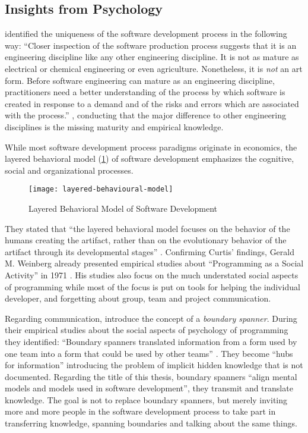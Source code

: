 \subsection{Insights from Psychology}
\label{sub:insights-from-psychology}
\citeauthor{kitchenham_research_1990} identified the uniqueness of the software development process in the following way: ``Closer inspection of the software production process suggests that it is an engineering discipline like any other engineering discipline. It is not as mature as electrical or chemical engineering or even agriculture. Nonetheless, it is \emph{not} an art form. Before software engineering can mature as an engineering discipline, practitioners need a better understanding of the process by which software is created in response to a demand and of the risks and errors which are associated with the process.'' \autocite[274]{kitchenham_research_1990}, conducting that the major difference to other engineering disciplines is the missing maturity and empirical knowledge.

While most software development process paradigms originate in economics, the layered behavioral model (\cref{fig:layered-behavioural-model}) of software development \autocite{curtis_psychology_1990} emphasizes the cognitive, social and organizational processes.
\begin{figure}[h]
\centering
\texttt{[image: layered-behavioural-model]}
\caption{Layered Behavioral Model of Software Development}
\label{fig:layered-behavioural-model}
\end{figure}
They stated that ``the layered behavioral model focuses on the behavior of the humans creating the artifact, rather than on the evolutionary behavior of the artifact through its developmental stages'' \autocite[254]{curtis_psychology_1990}.
Confirming Curtis' findings, Gerald M. Weinberg already presented empirical studies about ``Programming as a Social Activity'' in 1971 \autocite{weinberg_psychology_1971}.
His studies also focus on the much understated social aspects of programming while most of the focus is put on tools for helping the individual developer, and forgetting about group, team and project communication.

Regarding communication, \textcite{curtis_psychology_1990} introduce the concept of a \emph{boundary spanner}.
During their empirical studies about the social aspects of psychology of programming they identified: ``Boundary spanners translated information from a form used by one team into a form that could be used by other teams'' \autocite[264]{curtis_psychology_1990}.
They become ``hubs for information'' \autocite[264]{curtis_psychology_1990} introducing the problem of implicit hidden knowledge that is not documented.
Regarding the title of this thesis, boundary spanners ``align mental models and models used in software development'', they transmit and translate knowledge.
The goal is not to replace boundary spanners, but merely inviting more and more people in the software development process to take part in transferring knowledge, spanning boundaries and talking about the same things.


